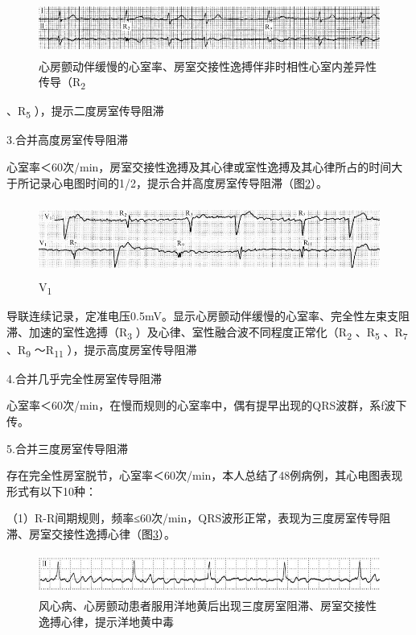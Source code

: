 \begin{figure}[!htbp]
 \centering
 \includegraphics[width=5.58333in,height=0.69792in]{./images/Image00223.jpg}
 \captionsetup{justification=centering}
 \caption{心房颤动伴缓慢的心室率、房室交接性逸搏伴非时相性心室内差异性传导（R\textsubscript{2}}
 \label{fig13-15}
  \end{figure} 
、R\textsubscript{5} ），提示二度房室传导阻滞

3.合并高度房室传导阻滞

心室率＜60次/min，房室交接性逸搏及其心律或室性逸搏及其心律所占的时间大于所记录心电图时间的1/2，提示合并高度房室传导阻滞（图\ref{fig13-16}）。

\begin{figure}[!htbp]
 \centering
 \includegraphics[width=5.58333in,height=0.94792in]{./images/Image00224.jpg}
 \captionsetup{justification=centering}
 \caption{V\textsubscript{1}}
 \label{fig13-16}
  \end{figure} 
导联连续记录，定准电压0.5mV。显示心房颤动伴缓慢的心室率、完全性左束支阻滞、加速的室性逸搏（R\textsubscript{3}
）及心律、室性融合波不同程度正常化（R\textsubscript{2}
、R\textsubscript{5} 、R\textsubscript{7} 、R\textsubscript{9}
～R\textsubscript{11} ），提示高度房室传导阻滞

4.合并几乎完全性房室传导阻滞

心室率＜60次/min，在慢而规则的心室率中，偶有提早出现的QRS波群，系f波下传。

5.合并三度房室传导阻滞

存在完全性房室脱节，心室率＜60次/min，本人总结了48例病例，其心电图表现形式有以下10种：

（1）R-R间期规则，频率≤60次/min，QRS波形正常，表现为三度房室传导阻滞、房室交接性逸搏心律（图\ref{fig13-17}）。

\begin{figure}[!htbp]
 \centering
 \includegraphics[width=5.61458in,height=0.53125in]{./images/Image00225.jpg}
 \captionsetup{justification=centering}
 \caption{风心病、心房颤动患者服用洋地黄后出现三度房室阻滞、房室交接性逸搏心律，提示洋地黄中毒}
 \label{fig13-17}
  \end{figure} 

